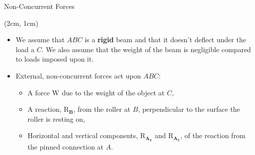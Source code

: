 \documentclass[9pt, xcolor={svgnames, x11names},professionalfonts]{beamer}
\def\scale{1}
\begin{document}
\begin{frame}{Non-Concurrent Forces}

	\begin{textblock*}{9cm}(2cm, 1cm)
		\begin{itemize}
			\item We assume that $ABC$ is a {\bfseries rigid} beam and that it doesn't deflect under the load a $C$. We also assume that the weight of the beam is negligible compared to loads imposed upon it.\parm
			\item External, non-concurrent forces act upon $ABC$:
			      \begin{itemize}
			      	\item<2->  A force \textcolor{saitDeepBlue}{$\bm{\mathrm{ W }_{}}$} due to the weight of the object at $C$,\parm
			      	\item<3-> A reaction, \textcolor{saitMaroon}{$\bm{\mathrm{ R }_{B}}$}, from the roller at $B$, perpendicular to the surface the roller is resting on,\parm
			      	\item<4-> Horizontal and vertical components, \textcolor{saitMaroon}{$\bm{\mathrm{ R }_{A_x}}$} and \textcolor{saitMaroon}{$\bm{\mathrm{ R }_{A_y}}$}, of the reaction from the pinned connection at $A$.
			      \end{itemize}
		\end{itemize}
	\end{textblock*}
	\uncover<1->{
		\begin{textblock*}{9cm}(2.5cm, 5.375cm)
			\def\scale{0.6}
			\tcb{
			 
			}
		\end{textblock*}
	}
\end{frame}

\end{document}
